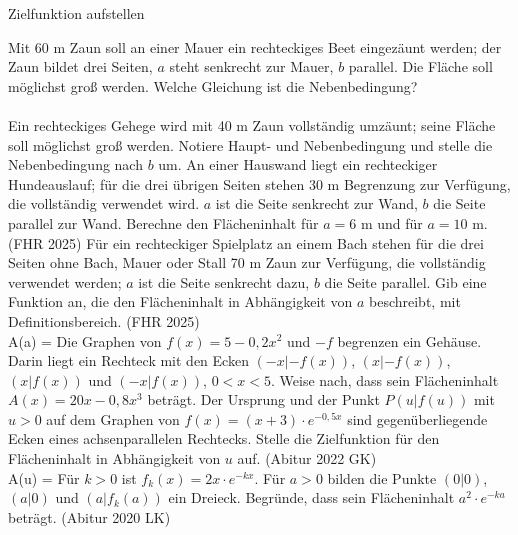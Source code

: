 \setcounter{aufgabe}{10}

\begin{aufgabe}{Zielfunktion aufstellen}
\begin{teile}
\teil Mit 60 m Zaun soll an einer Mauer ein rechteckiges Beet eingezäunt werden; der Zaun bildet drei Seiten, $a$ steht senkrecht zur Mauer, $b$ parallel. Die Fläche soll möglichst groß werden. Welche Gleichung ist die Nebenbedingung?  \\  \\ 
\teil Ein rechteckiges Gehege wird mit 40 m Zaun vollständig umzäunt; seine Fläche soll möglichst groß werden. Notiere Haupt- und Nebenbedingung und stelle die Nebenbedingung nach $b$ um.
\teil An einer Hauswand liegt ein rechteckiger Hundeauslauf; für die drei übrigen Seiten stehen 30 m Begrenzung zur Verfügung, die vollständig verwendet wird. $a$ ist die Seite senkrecht zur Wand, $b$ die Seite parallel zur Wand. Berechne den Flächeninhalt für $a = 6$ m und für $a = 10$ m. \hfill (FHR 2025)
\teil Für ein rechteckiger Spielplatz an einem Bach stehen für die drei Seiten ohne Bach, Mauer oder Stall 70 m Zaun zur Verfügung, die vollständig verwendet werden; $a$ ist die Seite senkrecht dazu, $b$ die Seite parallel. Gib eine Funktion an, die den Flächeninhalt in Abhängigkeit von $a$ beschreibt, mit Definitionsbereich. \hfill (FHR 2025) \\ A(a) = \leerfeld
\teil Die Graphen von $f(x) = 5 - 0{,}2x^2$ und $-f$ begrenzen ein Gehäuse. Darin liegt ein Rechteck mit den Ecken $(-x | -f(x))$, $(x | -f(x))$, $(x | f(x))$ und $(-x | f(x))$, $0 < x < 5$. Weise nach, dass sein Flächeninhalt $A(x) = 20x - 0{,}8x^3$ beträgt.
\teil Der Ursprung und der Punkt $P(u | f(u))$ mit $u > 0$ auf dem Graphen von $f(x) = (x + 3) \cdot e^{-0{,}5x}$ sind gegenüberliegende Ecken eines achsenparallelen Rechtecks. Stelle die Zielfunktion für den Flächeninhalt in Abhängigkeit von $u$ auf. \hfill (Abitur 2022 GK) \\ A(u) = \leerfeld
\teil Für $k > 0$ ist $f_k(x) = 2x \cdot e^{-kx}$. Für $a > 0$ bilden die Punkte $(0 | 0)$, $(a | 0)$ und $(a | f_k(a))$ ein Dreieck. Begründe, dass sein Flächeninhalt $a^2 \cdot e^{-ka}$ beträgt. \hfill (Abitur 2020 LK)
\end{teile}
\end{aufgabe}

